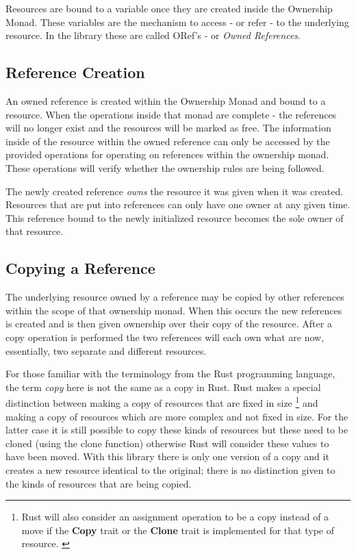 \documentclass[onehalf,11pt]{beavtex}
\begin{document}
Resources are bound to a variable once they are created inside the Ownership
Monad.  These variables are the mechanism to access - or refer - to the
underlying resource.  In the library these are called ORef's -
or \textit{Owned References}.

\subsection{Reference Creation}

An owned reference is created within the Ownership Monad and bound to a
resource. When the operations inside that monad are complete - the references
will no longer exist and the resources will be marked as free.
The information inside of the resource within the owned reference can
only be accessed by the provided operations for operating on references within
the ownership monad.  These operations will verify whether the
ownership rules are being followed.

The newly created reference \textit{owns} the resource it was given
when it was created. Resources that are put into references can only have one
owner at any given time. This reference bound to the newly initialized resource
becomes the sole owner of that resource.

\subsection{Copying a Reference}

The underlying resource owned by a reference may be copied by other references
within the scope of that ownership monad.  When this occurs the new references is
created and is then given ownership over their copy of the resource.  After a
copy operation is performed the two references will each own what are now,
essentially, two separate and different resources.

For those familiar with the terminology from the Rust programming language, the
term \textit{copy} here is not the same as a copy in Rust. Rust makes a special
distinction between making a copy of resources that are fixed in size
\footnote{Rust will also consider an assignment operation to be a copy instead
  of a move if the \textbf{Copy} trait or the \textbf{Clone} trait is
  implemented for that type of resource. \cite{rust_book_traits}
  \cite{rust_docs_clone_trait}}
and making a copy of resources which are more complex and not fixed in size.
For the latter case it is still possible to copy these kinds of resources but these
need to be cloned (using the clone function) otherwise Rust will consider these
values to have been moved. \cite{rust_book_ownership}
With this library there is only one version of a copy and it creates a new
resource identical to the original; there is no distinction given to the kinds
of resources that are being copied.
\end{document}
